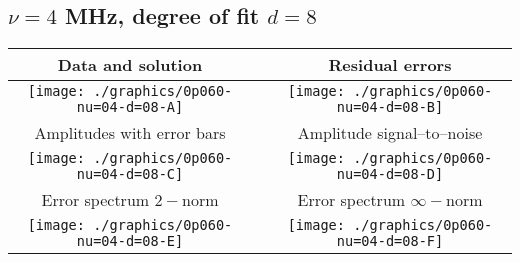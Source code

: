 

% 

\clearpage{}
\break{}

\subsection{$\nu = 4$ MHz, degree of fit $d = 8$}

\begin{table}[h]
    \begin{center}
        \begin{tabular}{ccc}
            Data and solution & \quad & Residual errors \\\hline
            \texttt{[image: ./graphics/0p060-nu=04-d=08-A]} &&
            \texttt{[image: ./graphics/0p060-nu=04-d=08-B]} \\[15pt]
            Amplitudes with error bars && Amplitude signal--to--noise \\\hline
            \texttt{[image: ./graphics/0p060-nu=04-d=08-C]} &&
            \texttt{[image: ./graphics/0p060-nu=04-d=08-D]} \\[15pt]
            Error spectrum $2-$norm && Error spectrum $\infty-$norm \\\hline
            \texttt{[image: ./graphics/0p060-nu=04-d=08-E]} &&
            \texttt{[image: ./graphics/0p060-nu=04-d=08-F]} \\[15pt]
        \end{tabular}
    \end{center}
\label{fig:elev=60, nu=4}
\end{table}



\endinput
